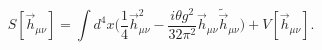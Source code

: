 \begin{equation}
\label{fourkalb}
S\left[\vec h_{\mu\nu}\right]=\int d^4x\Biggl(\frac{1}{4}\vec h_{\mu\nu}^2-\frac{i\theta g^2}{32\pi^2}
\vec h_{\mu\nu}\tilde{\vec h}_{\mu\nu}\Biggr)+V\left[\vec h_{\mu\nu}\right].
\end{equation}

